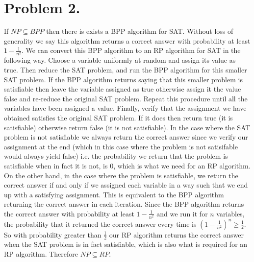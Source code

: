 \documentclass[12pt]{article}
\begin{document}
\section*{Problem 2.}
If $NP \subseteq BPP$ then there is exists a BPP algorithm for SAT. Without
loss of generality we say this algorithm returns a correct answer with probability
at least $1 - \frac{1}{n^2}$. We can convert this BPP algorithm to an RP
algorithm for SAT in the following way. Choose a variable uniformly at random
and assign its value as true. Then reduce the SAT problem, and run the BPP
algorithm for this smaller SAT problem. If the BPP algorithm returns saying that this smaller
problem is satisfiable then leave the variable assigned as true otherwise assign
it the value false and re-reduce the original SAT problem. Repeat this procedure
until all the variables have been assigned a value. Finally, verify that the
assignment we have obtained satisfies the original SAT problem. If it does then
return true (it is satisfiable) otherwise return false (it is not satisfiable).
In the case where the SAT problem is not satisfiable we always return the correct
answer since we verify our assignment at the end (which in this case where the
problem is not satisifable would always yield false) i.e. the probability we
return that the problem is satisfiable when in fact it is not, is 0, which is what
we need for an RP algorithm. On the other hand, in the case where the problem is
satisfiable, we return the correct answer if and only if we assigned each variable
in a way such that we end up with a satisfying assignment. This is equivalent to
the BPP algorithm returning the correct answer in each iteration. Since the BPP
algorithm returns the correct answer with probability at least
$1 - \frac{1}{n^2}$ and we run it for $n$ variables, the probability that it
returned the correct answer every time is
$(1 - \frac{1}{n^2})^n \ge \frac{1}{2}$. So with probability greater than
$\frac{1}{2}$ our RP algorithm returns the correct answer when the SAT problem
is in fact satisfiable, which is also what is required for an RP algorithm.
Therefore $NP \subseteq RP$.
\end{document}
